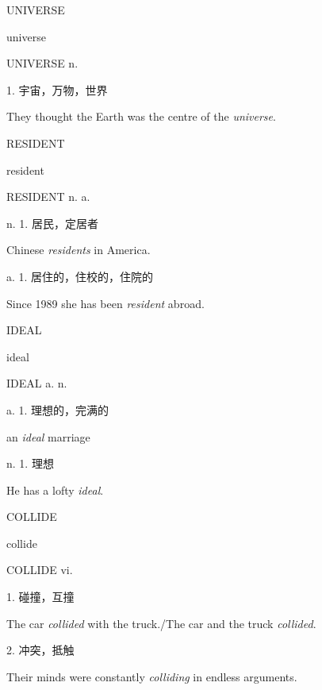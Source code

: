 \begin{flashcard}{
UNIVERSE

universe
}
\begin{center}
UNIVERSE n. 
\end{center}
1. 宇宙，万物，世界

They thought the Earth was the centre of the \textit{universe}.

\end{flashcard}
\begin{flashcard}{
RESIDENT

resident
}
\begin{center}
RESIDENT n. a. 
\end{center}
n. 1. 居民，定居者

Chinese \textit{residents} in America.

a. 1. 居住的，住校的，住院的

Since 1989 she has been \textit{resident} abroad.

\end{flashcard}
\begin{flashcard}{
IDEAL

ideal
}
\begin{center}
IDEAL a. n. 
\end{center}
a. 1. 理想的，完满的

an \textit{ideal} marriage

n. 1. 理想

He has a lofty \textit{ideal}.

\end{flashcard}
\begin{flashcard}{
COLLIDE

collide
}
\begin{center}
COLLIDE vi. 
\end{center}
1. 碰撞，互撞

The car \textit{collided} with the truck./The car and the truck \textit{collided}.

2. 冲突，抵触

Their minds were constantly \textit{colliding} in endless arguments.

\end{flashcard}

